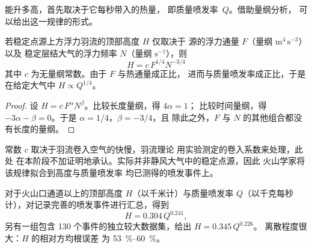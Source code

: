 \begin{omfigure}
\par{}
\end{omfigure}

能升多高，首先取决于它每秒带入的热量，
即质量喷发率~$Q$。借助量纲分析，
可以给出这一规律的形式。

\begin{proposition}[有浮力羽流的高度]\label{prop:b2:eruptive-styles:plume}
若稳定点源上方浮力羽流的顶部高度 $H$ 仅取决于
源的浮力通量 $F$（量纲 $\mathrm{m^4\,s^{-3}}$）以及
稳定层结大气的浮力频率 $N$（量纲
$\mathrm{s^{-1}}$），则
\[
H = c\,F^{1/4}N^{-3/4}
\]
其中 $c$ 为无量纲常数。由于 $F$ 与热通量成正比，
进而与质量喷发率成正比，于是在给定大气中 $H \propto Q^{1/4}$。
\end{proposition}

\begin{proof}
设 $H = c\,F^{\alpha}N^{\beta}$。比较长度量纲，得 $4\alpha = 1$；
比较时间量纲，得 $-3\alpha - \beta = 0$。于是 $\alpha = 1/4$，$\beta = -3/4$，且
除此之外，$F$ 与 $N$ 的其他组合都没有长度的量纲。
\end{proof}

常数 $c$ 取决于羽流卷入空气的快慢，羽流理论
用实验测定的卷入系数来处理，此处
在本阶段不加证明地承认。实际并非静风大气中的稳定点源，因此
火山学家将该规律拟合到高度与质量喷发率
均已测得的喷发事件上。

\begin{proposition}[喷发柱高度与质量喷发率]\label{prop:b2:eruptive-styles:mastin}
对于火山口通道以上的顶部高度 $H$（以千米计）与质量喷发率
$Q$（以千克每秒计），对记录完善的喷发事件进行汇总，得到
\[
H = 0.304\,Q^{0.241},
\]
另有一组包含 130 个事件的独立较大数据集，给出 $H = 0.345\,Q^{0.226}$。
离散程度很大：$H$ 的相对方均根误差
为 \qtyrange{53}{60}{\percent}。
\end{proposition}
\admitted


